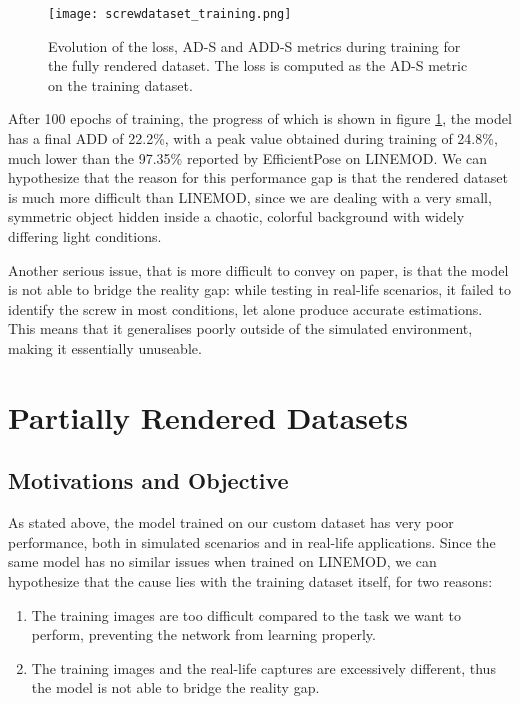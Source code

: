 \begin{figure}[ht]
    \texttt{[image: screwdataset\_training.png]}
    \caption{Evolution of the loss, AD-S and ADD-S metrics during training for the fully rendered dataset. The loss is computed as the AD-S metric on the training dataset.}
    \label{fig:screwdataset_training}
\end{figure}

After 100 epochs of training, the progress of which is shown in figure \ref{fig:screwdataset_training}, the model has a final ADD of 22.2\%, with a peak value obtained during training of 24.8\%, much lower than the 97.35\% reported by EfficientPose on LINEMOD. We can hypothesize that the reason for this performance gap is that the rendered dataset is much more difficult than LINEMOD, since we are dealing with a very small, symmetric object hidden inside a chaotic, colorful background with widely differing light conditions.

Another serious issue, that is more difficult to convey on paper, is that the model is not able to bridge the reality gap: while testing in real-life scenarios, it failed to identify the screw in most conditions, let alone produce accurate estimations. This means that it generalises poorly outside of the simulated environment, making it essentially unuseable.

\section{Partially Rendered Datasets}

\subsection{Motivations and Objective}

As stated above, the model trained on our custom dataset has very poor performance, both in simulated scenarios and in real-life applications. Since the same model has no similar issues when trained on LINEMOD, we can hypothesize that the cause lies with the training dataset itself, for two reasons:

\begin{enumerate}
    \item The training images are too difficult compared to the task we want to perform, preventing the network from learning properly.
    \item The training images and the real-life captures are excessively different, thus the model is not able to bridge the reality gap.
\end{enumerate}

